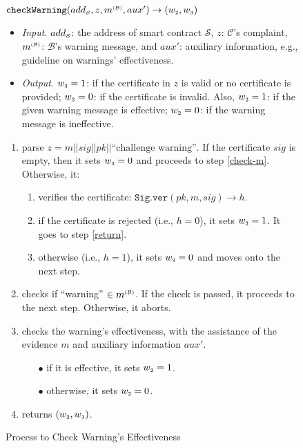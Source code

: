 \begin{figure}[!htbp]
\setlength{\fboxsep}{0.7pt}
\begin{center}
\begin{boxedminipage}{12.3cm}
\small{
\underline{$\mathtt{checkWarning}(add_{\scriptscriptstyle\mathcal{S}}, z, m^{\scriptscriptstyle\mathcal{(B)}},  aux')\rightarrow (w_{\scriptscriptstyle 2},  w_{\scriptscriptstyle 3})$}\\
%
\begin{itemize}
%
\item \noindent\textit{Input}. $add_{\scriptscriptstyle\mathcal{S}}$: the address of smart contract $\mathcal{S}$, $z$:  $\mathcal{C}$'s complaint, $m^{\scriptscriptstyle\mathcal{(B)}}$:  $\mathcal{B}$'s warning message,  and $aux'$: auxiliary information, e.g., guideline on warnings' effectiveness. 
%
\item\noindent\textit{Output}. $w_{\scriptscriptstyle 3}=1$: if the certificate in $z$ is valid or no certificate is provided; $ w_{\scriptscriptstyle 3}=0$: if the certificate is invalid. Also, 
$w_{\scriptscriptstyle 2}=1$: if the given warning message is effective; $w_{\scriptscriptstyle 2}=0$: if the  warning message is ineffective.

\end{itemize}


\begin{enumerate}
%
\item parse $z= m||sig||pk||\text{``challenge warning''}$. If the certificate $sig$ is  empty, then it  sets $w_{\scriptscriptstyle 3}=0$ and proceeds to  step \ref{check-m}. Otherwise, it:
%
\begin{enumerate} 
%
\item verifies the certificate: $\mathtt{Sig.ver}(pk, m, sig)\rightarrow h$. 
%
\item if  the certificate is rejected (i.e., $h=0$),  it sets $w_{\scriptscriptstyle 3}=1$. It  goes to step \ref{return}. 
%
\item otherwise (i.e., $h=1$), it sets $w_{\scriptscriptstyle 3}=0$ and moves onto the next step. 
\end{enumerate}
%
%
\item\label{check-m} checks if ``warning'' $\in m^{\scriptscriptstyle\mathcal{(B)}}$.  If the check is passed, it proceeds to the next step. Otherwise, it aborts. 
%
\item checks the warning's effectiveness, with the assistance of the evidence $m$ and auxiliary information $aux'$. 
%
\begin{itemize}
\item[$\bullet$]  if it is effective,  it sets $w_{\scriptscriptstyle 2} = 1$.
\item [$\bullet$] otherwise, it sets $w_{\scriptscriptstyle 2} = 0$.
\end{itemize}
\item\label{return} returns $(w_{\scriptscriptstyle 2}, w_{\scriptscriptstyle 3})$.
\end{enumerate}
 
}
\end{boxedminipage}
\end{center}
\caption{Process to Check Warning's Effectiveness} 
\label{fig:checkWarning}
\end{figure}
